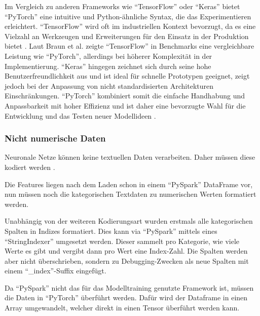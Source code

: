 Im Vergleich zu anderen Frameworks wie \enquote{TensorFlow} oder \enquote{Keras} bietet \enquote{PyTorch} eine intuitive und Python-ähnliche Syntax, die das Experimentieren erleichtert. \enquote{TensorFlow} wird oft im industriellen Kontext bevorzugt, da es eine Vielzahl an Werkzeugen und Erweiterungen für den Einsatz in der Produktion bietet \cite{Braun2018}. Laut Braun et al. \cite{Braun2018} zeigte \enquote{TensorFlow} in Benchmarks eine vergleichbare Leistung wie \enquote{PyTorch}, allerdings bei höherer Komplexität in der Implementierung. \enquote{Keras} hingegen zeichnet sich durch seine hohe Benutzerfreundlichkeit aus und ist ideal für schnelle Prototypen geeignet, zeigt jedoch bei der Anpassung von nicht standardisierten Architekturen Einschränkungen. \enquote{PyTorch} kombiniert somit die einfache Handhabung und Anpassbarkeit mit hoher Effizienz und ist daher eine bevorzugte Wahl für die Entwicklung und das Testen neuer Modellideen \cite{paszke2019pytorch}.



\subsubsection{Nicht numerische Daten}
Neuronale Netze können keine textuellen Daten verarbeiten. 
Daher müssen diese kodiert werden \cite{Goodfellow2016}.

Die Features liegen nach dem Laden schon in einem \enquote{PySpark} DataFrame vor, nun müssen noch die kategorischen Textdaten zu numerischen Werten formatiert werden. 

Unabhängig von der weiteren Kodierungsart wurden erstmals alle kategorischen Spalten in Indizes formatiert. 
Dies kann via \enquote{PySpark} mittels eines \enquote{StringIndexer} umgesetzt werden. Dieser sammelt pro Kategorie, wie viele Werte es gibt und vergibt dann pro Wert eine Index-Zahl. Die Spalten werden aber nicht überschrieben, sondern zu Debugging-Zwecken als neue Spalten mit einem \enquote{\_index}-Suffix eingefügt.  

Da \enquote{PySpark} nicht das für das Modelltraining genutzte Framework ist, müssen die Daten in \enquote{PyTorch} überführt werden. Dafür wird der Dataframe in einen Array umgewandelt, welcher direkt in einen Tensor überführt werden kann. 


